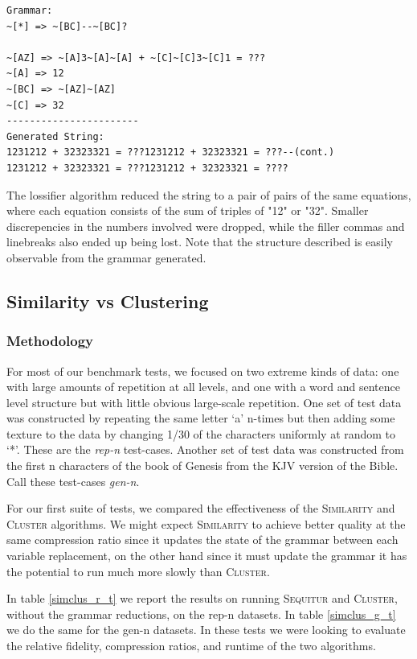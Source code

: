 \documentclass[11pt]{article}
\newcommand{\Sequitur}{\textsc{Sequitur}\xspace}
\newcommand{\Similarity}{\textsc{Similarity}\xspace}
\newcommand{\Cluster}{\textsc{Cluster}\xspace}
\begin{document}
\begin{verbatim}
Grammar:
~[*] => ~[BC]--~[BC]?

~[AZ] => ~[A]3~[A]~[A] + ~[C]~[C]3~[C]1 = ???
~[A] => 12
~[BC] => ~[AZ]~[AZ]
~[C] => 32
-----------------------
Generated String:
1231212 + 32323321 = ???1231212 + 32323321 = ???--(cont.)
1231212 + 32323321 = ???1231212 + 32323321 = ????
\end{verbatim}

The lossifier algorithm reduced the string to a pair of pairs of the same
equations, where each equation consists of the sum of triples of "12" or "32".
Smaller discrepencies in the numbers involved were dropped, while the filler
commas and linebreaks also ended up being lost. Note that the structure
described is easily observable from the grammar generated.

\subsection{Similarity vs Clustering}

\subsubsection{Methodology}

For most of our benchmark tests, we focused on two extreme kinds of data: one
with large amounts of repetition at all levels, and one with a word and
sentence level structure but with little obvious large-scale repetition.  One
set of test data was constructed by repeating the same letter `a' n-times but
then adding some texture to the data by changing 1/30 of the characters
uniformly at random to `*'. These are the \emph{rep-n} test-cases.  Another set
of test data was constructed from the first n characters of the book of Genesis
from the KJV version of the Bible. Call these test-cases \emph{gen-n}.

For our first suite of tests, we compared the effectiveness of the \Similarity
and \Cluster algorithms. We might expect \Similarity to achieve better quality
at the same compression ratio since it updates the state of the grammar between
each variable replacement, on the other hand since it must update the grammar
it has the potential to run much more slowly than \Cluster.

In table \ref{simclus_r_t} we report the results on running \Sequitur and
\Cluster, without the grammar reductions, on the rep-n datasets. In table
\ref{simclus_g_t} we do the same for the gen-n datasets.  In these tests we
were looking to evaluate the relative fidelity, compression ratios, and runtime
of the two algorithms.
\end{document}
